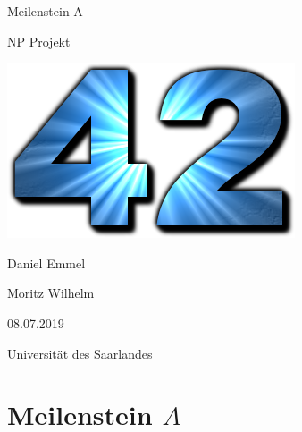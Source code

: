 \documentclass[12pt,a4paper]{scrartcl}
\numberwithin{equation}{section}
\begin{document}
  \pagestyle{empty}

  \begin{titlepage}

     

 \begin{center} \large 
    
    Meilenstein A
    \vspace*{2cm}

    {\huge NP Projekt}
    \vspace*{2.5cm}
    
    
    \includegraphics[scale=0.45]{Answer_to_Life.png} 
    \vspace*{2cm}

	Daniel Emmel
    \vspace*{1.5cm}
    
    Moritz Wilhelm
    \vspace*{1.5cm}

    08.07.2019
    \vspace*{4.5cm}

		Universität des Saarlandes
  \end{center}
\end{titlepage}



  \tableofcontents

\newpage
 


  \pagestyle{headings}

\section{Meilenstein $ A $}
\end{document}
